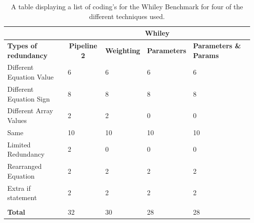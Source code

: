 \begin{table}[h]
\centering
\label{whileycoding}
\begin{tabular}{|l|l|l|l|l|}
\hline
                          & \multicolumn{4}{c|}{{\bf Whiley}}                                                             \\ \hline
{\bf Types of redundancy} & \multicolumn{1}{c|}{{\bf Pipeline 2}} & {\bf Weighting} & {\bf Parameters} & {\bf Parameters \& Params} \\ \hline
Different Equation Value  & 6                                     & 6               & 6                & 6                \\ \hline
Different Equation Sign   & 8                                     & 8               & 8                & 8                \\ \hline
Different Array Values    & 2                                     & 2               & 0                & 0                \\ \hline
Same                      & 10                                    & 10              & 10               & 10               \\ \hline
Limited Redundancy        & 2                                     & 0               & 0                & 0                \\ \hline
Rearranged Equation       & 2                                     & 2               & 2                & 2                \\ \hline
Extra if statement        & 2                                     & 2               & 2                & 2                \\ \hline
                          &                                       &                 &                  &                  \\ \hline
{\bf Total}               & 32                                    & 30              & 28               & 28               \\ \hline
\end{tabular}
\caption{A table displaying a list of coding's for the Whiley Benchmark for four of the different techniques used.}
\end{table}